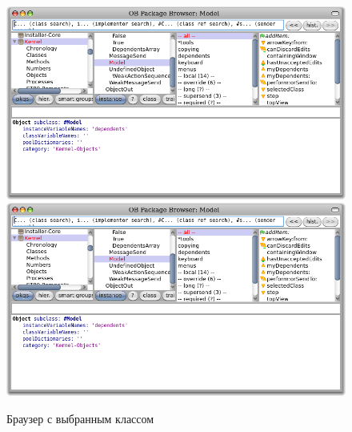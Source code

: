 \documentclass[a4paper,10pt,twoside]{book}
\begin{document}
\begin{figure}[htbp]
   \centering
   \ifluluelse
	   {\includegraphics[width=\textwidth]{SystemBrowser1} }
	   {\includegraphics[width=.7\textwidth]{SystemBrowser1} }
   \caption{Браузер с выбранным классом 
   }
\end{figure}

\end{document}
